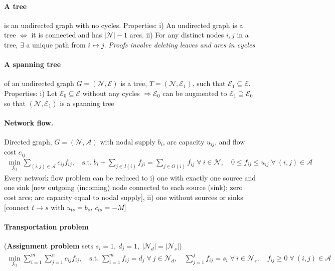 \documentclass{article}
\begin{document}
\paragraph{A tree} is an undirected graph with no cycles. Properties: i) An undirected graph is a tree $\iff$ it is connected and has $|\mathcal N|-1$ arcs. ii) For any distinct nodes $i,j$ in a tree, $\exists$ a unique path from $i\leftrightarrow j$. \emph{Proofs involve deleting leaves and arcs in cycles}

\paragraph{A spanning tree} of an undirected graph $G=(\mathcal N,\mathcal E)$ is a tree, $T=(\mathcal N, \mathcal E_1)$, such that $\mathcal E_1 \subseteq \mathcal E$. Properties: i) Let $\mathcal E_0\subseteq \mathcal E$ without any cycles $\Longrightarrow \mathcal E_0$ can be augmented to $\mathcal E_1 \supseteq \mathcal E_0$ so that $(\mathcal N, \mathcal E_1)$ is a spanning tree 

\paragraph{Network flow.} Directed graph, $G=(\mathcal N, \mathcal A)$ with nodal supply $b_i$, arc capacity $u_{ij}$, and flow cost $c_{ij}$
\begin{align*}
    \min_{f_{ij}} \sum_{(i,j)\in\mathcal A}c_{ij}f_{ij}, \quad \text{s.t.}\; b_i + \sum_{j\in I(i)}f_{ji} = \sum_{j\in O(i)}f_{ij}\; \forall\ i\in \mathcal N, \quad 0 \leq f_{ij} \leq u_{ij}\;\forall\ (i,j)\in \mathcal A
\end{align*} 
Every network flow problem can be reduced to i) one with exactly one source and one sink [new outgoing (incoming) node connected to each source (sink); zero cost arcs; arc capacity equal to nodal supply], ii) one without sources or sinks [connect $t\rightarrow s$ with $u_{ts}=b_s,\ c_{ts}=-M$]

\paragraph{Transportation problem} (\textbf{Assignment problem} sets $s_i=1,\ d_j=1,\ |\mathcal N_d| = |\mathcal N_s|$)
\begin{align*}
    \min_{f_{ij}} \sum_{i=1}^m\sum_{j=1}^nc_{ij}f_{ij}, \quad \text{s.t.}\; \sum_{i=1}^mf_{ij} = d_j\; \forall\ j\in\mathcal N_d, \quad \sum_{j=1}^jf_{ij} = s_i\; \forall\ i\in\mathcal N_s,\quad f_{ij}\geq 0\;\forall\ (i,j)\in \mathcal A
\end{align*}
\end{document}
